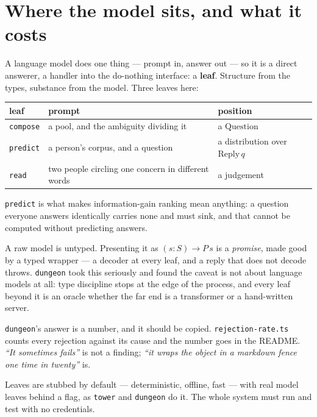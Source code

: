 \documentclass[11pt,a4paper]{article}
\newcommand{\Reply}{\mathrm{Reply}}
\newcommand{\Question}{\mathrm{Question}}
\begin{document}
\section{Where the model sits, and what it costs}

A language model does one thing --- prompt in, answer out --- so it is a direct
answerer, a handler into the do-nothing interface: a \textbf{leaf}. Structure
from the types, substance from the model. Three leaves here:

\begin{center}
\begin{tabular}{@{}lll@{}}
\toprule
leaf & prompt & position \\
\midrule
\texttt{compose} & a pool, and the ambiguity dividing it & a $\Question$ \\
\texttt{predict} & a person's corpus, and a question & a distribution over $\Reply\,q$ \\
\texttt{read} & two people circling one concern in different words & a judgement \\
\bottomrule
\end{tabular}
\end{center}

\texttt{predict} is what makes information-gain ranking mean anything: a question
everyone answers identically carries none and must sink, and that cannot be
computed without predicting answers.

\begin{alarmbox}
A raw model is untyped. Presenting it as $(s : S) \to P\,s$ is a \emph{promise},
made good by a typed wrapper --- a decoder at every leaf, and a reply that does
not decode throws. \texttt{dungeon} took this seriously and found the caveat is
not about language models at all: type discipline stops at the edge of the
process, and every leaf beyond it is an oracle whether the far end is a
transformer or a hand-written server.
\end{alarmbox}

\texttt{dungeon}'s answer is a number, and it should be copied.
\texttt{rejection-rate.ts} counts every rejection against its cause and the number
goes in the README. \emph{``It sometimes fails''} is not a finding; \emph{``it
wraps the object in a markdown fence one time in twenty''} is.

Leaves are stubbed by default --- deterministic, offline, fast --- with real
model leaves behind a flag, as \texttt{tower} and \texttt{dungeon} do it. The
whole system must run and test with no credentials.
\end{document}
